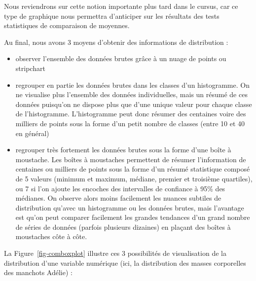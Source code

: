 \documentclass[
  a4paper,
  DIV=11,
  numbers=noendperiod,
  oneside]{scrreprt}
\providecommand{\tightlist}{%
  \setlength{\itemsep}{0pt}\setlength{\parskip}{0pt}}\usepackage{longtable,booktabs,array}
\begin{document}
Nous reviendrons sur cette notion importante plus tard dans le cursus,
car ce type de graphique nous permettra d'anticiper sur les résultats
des tests statistiques de comparaison de moyennes.

Au final, nous avons 3 moyens d'obtenir des informations de distribution
:

\begin{itemize}
\tightlist
\item
  observer l'ensemble des données brutes grâce à un nuage de points ou
  stripchart
\item
  regrouper en partie les données brutes dans les classes d'un
  histogramme. On ne visualise plus l'ensemble des données
  individuelles, mais un résumé de ces données puisqu'on ne dispose plus
  que d'une unique valeur pour chaque classe de l'histogramme.
  L'histogramme peut donc résumer des centaines voire des milliers de
  points sous la forme d'un petit nombre de classes (entre 10 et 40 en
  général)
\item
  regrouper très fortement les données brutes sous la forme d'une boîte
  à moustache. Les boîtes à moustaches permettent de résumer
  l'information de centaines ou milliers de points sous la forme d'un
  résumé statistique composé de 5 valeurs (minimum et maximum, médiane,
  premier et troisième quartiles), ou 7 si l'on ajoute les encoches des
  intervalles de confiance à 95\% des médianes. On observe alors moins
  facilement les nuances subtiles de distribution qu'avec un histogramme
  ou les données brutes, mais l'avantage est qu'on peut comparer
  facilement les grandes tendances d'un grand nombre de séries de
  données (parfois plusieurs dizaines) en plaçant des boîtes à
  moustaches côte à côte.
\end{itemize}

La Figure~\ref{fig-comboxplot} illustre ces 3 possibilités de
visualisation de la distribution d'une variable numérique (ici, la
distribution des masses corporelles des manchots Adélie) :
\end{document}
